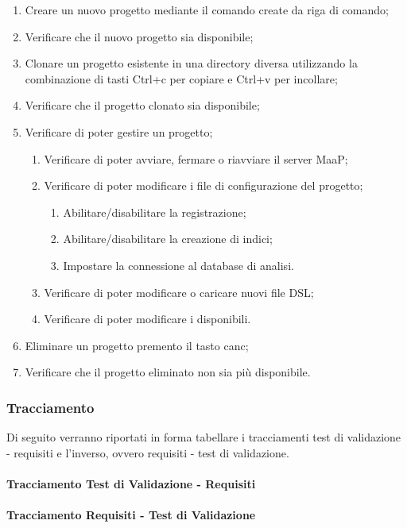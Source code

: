 \begin{enumerate}
\item Creare un nuovo progetto mediante il comando create da riga di comando;
\item Verificare che il nuovo progetto sia disponibile;
\item Clonare un progetto esistente in una directory diversa utilizzando la combinazione di tasti Ctrl+c per copiare e Ctrl+v per incollare;
\item Verificare che il progetto clonato sia disponibile;
\item Verificare di poter gestire un progetto;
\begin{enumerate}
\item Verificare di poter avviare, fermare o riavviare il server MaaP;
\item Verificare di poter modificare i file di configurazione del progetto;
\begin{enumerate}
\item Abilitare/disabilitare la registrazione;
\item Abilitare/disabilitare la creazione di indici;
\item Impostare la connessione al database di analisi.
\end{enumerate}
\item Verificare di poter modificare o caricare nuovi file DSL;
\item Verificare di poter modificare i  disponibili.
\end{enumerate}
\item Eliminare un progetto premento il tasto canc;
\item Verificare che il progetto eliminato non sia più disponibile.
\end{enumerate}

\subsubsection{Tracciamento}
Di seguito verranno riportati in forma tabellare i tracciamenti test di validazione - requisiti e l'inverso, ovvero requisiti - test di validazione.\\

\paragraph{Tracciamento Test di Validazione - Requisiti}


\paragraph{Tracciamento Requisiti - Test di Validazione}
